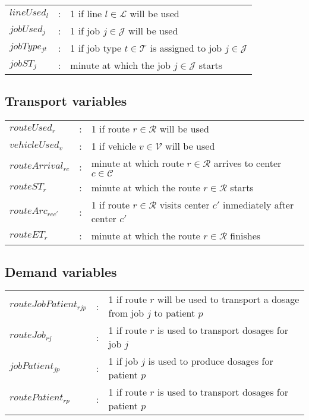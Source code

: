 \begin{tabular}{p{15mm}lp{105mm}}
    $lineUsed_{l}$    & : & 1 if line $l \in \mathcal{L}$ will be used  \\  
    $jobUsed_{j}$    & : & 1 if job $j \in \mathcal{J}$ will be used  \\  
    $jobType_{jt}$    & : & 1 if job type $t \in \mathcal{T}$ is assigned to job $j \in \mathcal{J}$ \\  
    $jobST_{j}$    & : & minute at which the job $j \in \mathcal{J}$ starts \\  
\end{tabular}
\bigskip

\subsection{Transport variables}

\begin{tabular}{p{30mm}lp{90mm}}
    $routeUsed_{r}$    & : & 1 if route $r \in \mathcal{R}$ will be used  \\  
    $vehicleUsed_{v}$    & : & 1 if vehicle $v \in \mathcal{V}$ will be used  \\  
    $routeArrival_{rc}$    & : & minute at which route $r \in \mathcal{R}$ arrives to center $c \in \mathcal{C}$ \\  
    $routeST_{r}$    & : & minute at which the route $r \in \mathcal{R}$ starts \\
    $routeArc_{rcc'}$    & : & 1 if route $r \in \mathcal{R}$ visits center $c'$ inmediately after center $c'$  \\
    $routeET_{r}$    & : & minute at which the route $r \in \mathcal{R}$ finishes \\
\end{tabular}
\bigskip

\subsection{Demand variables}

\begin{tabular}{p{30mm}lp{90mm}}
    $routeJobPatient_{rjp}$    & : & 1 if route $r$ will be used to transport a dosage from job $j$ to patient $p$ \\  
    $routeJob_{rj}$    & : & 1 if route $r$ is used to transport dosages for job $j$ \\  
    $jobPatient_{jp}$    & : & 1 if job $j$ is used to produce dosages for patient $p$ \\  
    $routePatient_{rp}$    & : & 1 if route $r$ is used to transport dosages for patient $p$\\
\end{tabular}
\bigskip


